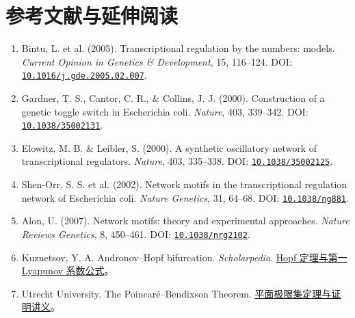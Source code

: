 \chapter*{参考文献与延伸阅读}
\begin{enumerate}[leftmargin=*,itemsep=2pt,parsep=0pt]\small
\item Bintu, L. et al. (2005). Transcriptional regulation by the numbers: models. \emph{Current Opinion in Genetics \& Development}, 15, 116--124. DOI: \href{https://doi.org/10.1016/j.gde.2005.02.007}{\nolinkurl{10.1016/j.gde.2005.02.007}}.
\item Gardner, T. S., Cantor, C. R., \& Collins, J. J. (2000). Construction of a genetic toggle switch in Escherichia coli. \emph{Nature}, 403, 339--342. DOI: \href{https://doi.org/10.1038/35002131}{\nolinkurl{10.1038/35002131}}.
\item Elowitz, M. B. \& Leibler, S. (2000). A synthetic oscillatory network of transcriptional regulators. \emph{Nature}, 403, 335--338. DOI: \href{https://doi.org/10.1038/35002125}{\nolinkurl{10.1038/35002125}}.
\item Shen-Orr, S. S. et al. (2002). Network motifs in the transcriptional regulation network of Escherichia coli. \emph{Nature Genetics}, 31, 64--68. DOI: \href{https://doi.org/10.1038/ng881}{\nolinkurl{10.1038/ng881}}.
\item Alon, U. (2007). Network motifs: theory and experimental approaches. \emph{Nature Reviews Genetics}, 8, 450--461. DOI: \href{https://doi.org/10.1038/nrg2102}{\nolinkurl{10.1038/nrg2102}}.
\item Kuznetsov, Y. A. Andronov--Hopf bifurcation. \emph{Scholarpedia}. \href{https://www.scholarpedia.org/article/Andronov-Hopf_bifurcation}{Hopf 定理与第一 Lyapunov 系数公式}。
\item Utrecht University. The Poincar\'e--Bendixson Theorem. \href{https://webspace.science.uu.nl/~hanss102/inlds224/PoincareBendixsonTheorem.pdf}{平面极限集定理与证明讲义}。
\end{enumerate}
